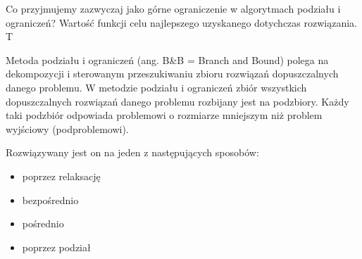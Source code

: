 \answer
{Co przyjmujemy zazwyczaj jako górne ograniczenie w algorytmach podziału i ograniczeń?}
{Wartość funkcji celu najlepszego uzyskanego dotychczas rozwiązania.}
{T}
{}
{Metoda podziału i ograniczeń (ang. B\&B = Branch and Bound) polega na dekompozycji i sterowanym przeszukiwaniu zbioru rozwiązań dopuszczalnych danego problemu. W metodzie podziału i ograniczeń zbiór wszystkich dopuszczalnych rozwiązań danego problemu rozbijany jest na podzbiory. Każdy taki podzbiór odpowiada problemowi o rozmiarze mniejszym niż problem wyjściowy (podproblemowi). 

Rozwiązywany jest on na jeden z następujących sposobów: 
\begin{itemize}
\item poprzez relaksację
\item bezpośrednio
\item pośrednio
\item poprzez podział
\end{itemize}
}




